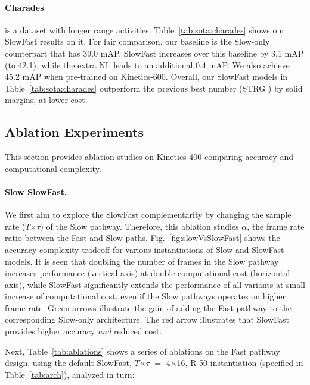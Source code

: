 \documentclass[10pt,twocolumn,letterpaper]{article}
\newcommand{\figref}[1]{Fig.~\ref{#1}}
\newcommand{\tblref}[1]{Table~\ref{#1}}
\def\x{$\times$}
\renewcommand{\omega}{\alpha}
\begin{document}
	\paragraph{Charades} \cite{Sigurdsson2016} is a dataset with longer range activities. \tblref{tab:sota:charades} shows our SlowFast results on it. For fair comparison, our baseline is the Slow-only counterpart that has 39.0 mAP. SlowFast increases over this baseline by 3.1 mAP (to 42.1), while the extra NL leads to an additional 0.4 mAP. We also achieve 45.2 mAP when pre-trained on Kinetics-600. Overall, our SlowFast models in \tblref{tab:sota:charades} outperform the previous best number (STRG \cite{Wang2018b}) by solid margins, at lower cost.
		
	\subsection{Ablation Experiments}
	This section provides ablation studies on Kinetics-400 comparing accuracy and computational complexity. %
	
	\paragraph{Slow \vs SlowFast.}
	We first aim to explore the SlowFast complementarity by changing the sample rate  ($T$\x$\tau$) of the Slow pathway. 
	Therefore, this ablation studies $\omega$, the frame rate ratio between the Fast and Slow paths. 	\figref{fig:slowVsSlowFast} shows the accuracy \vs complexity tradeoff for various instantiations of Slow and SlowFast models. It is seen that doubling the number of frames in the Slow pathway increases performance (vertical axis) at double computational cost (horizontal axis), while SlowFast significantly extends the performance of all variants at small increase of computational cost, even if the Slow pathways operates on higher frame rate. Green arrows illustrate the gain of adding the Fast pathway to the corresponding Slow-only architecture. The red arrow illustrates that SlowFast provides higher accuracy \textit{and} reduced cost. 
	
	Next, Table~\ref{tab:ablations} shows a series of ablations on the Fast pathway design, using the default SlowFast, $T$\x$\tau$ $=$ 4\x16, R-50 instantiation (specified in \tblref{tab:arch}), analyzed in turn:
	
\end{document}
